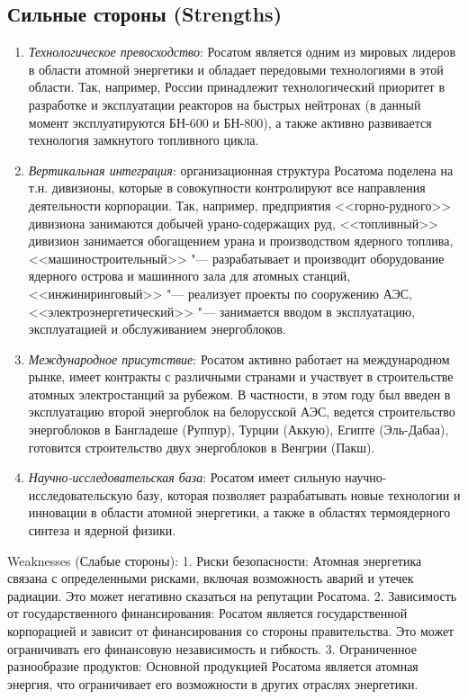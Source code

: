 \subsection{Сильные стороны (Strengths)}
\begin{enumerate}
\item \emph{Технологическое превосходство}: Росатом является одним из мировых лидеров в области атомной энергетики и обладает передовыми технологиями в этой области. Так, например, России принадлежит технологический приоритет в разработке и эксплуатации реакторов на быстрых нейтронах (в данный момент эксплуатируются БН-600 и БН-800), а также активно развивается технология замкнутого топливного цикла.

\item \emph{Вертикальная интеграция}: организационная структура Росатома поделена на т.н. дивизионы, которые в совокупности контролируют все направления деятельности корпорации. Так, например, предприятия <<горно-рудного>> дивизиона занимаются добычей урано-содержащих руд, <<топливный>> дивизион занимается обогащением урана и производством ядерного топлива, <<машиностроительный>> "--- разрабатывает и производит оборудование ядерного острова и машинного зала для атомных станций, <<инжиниринговый>> "--- реализует проекты по сооружению АЭС, <<электроэнергетический>> "--- занимается вводом в эксплуатацию, эксплуатацией и обслуживанием энергоблоков.

\item \emph{Международное присутствие}: Росатом активно работает на международном рынке, имеет контракты с различными странами и участвует в строительстве атомных электростанций за рубежом. В частности, в этом году был введен в эксплуатацию второй энергоблок на белорусской АЭС, ведется строительство энергоблоков в Бангладеше (Руппур), Турции (Аккую), Египте (Эль-Дабаа), готовится строительство двух энергоблоков в Венгрии (Пакш).

\item \emph{Научно-исследовательская база}: Росатом имеет сильную научно-исследовательскую базу, которая позволяет разрабатывать новые технологии и инновации в области атомной энергетики, а также в областях термоядерного синтеза и ядерной физики.
\end{enumerate}
Weaknesses (Слабые стороны):
1. Риски безопасности: Атомная энергетика связана с определенными рисками, включая возможность аварий и утечек радиации. Это может негативно сказаться на репутации Росатома.
2. Зависимость от государственного финансирования: Росатом является государственной корпорацией и зависит от финансирования со стороны правительства. Это может ограничивать его финансовую независимость и гибкость.
3. Ограниченное разнообразие продуктов: Основной продукцией Росатома является атомная энергия, что ограничивает его возможности в других отраслях энергетики.

